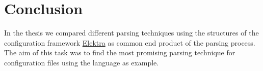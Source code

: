 \chapter{Conclusion}

%
%
%

In the thesis we compared different parsing techniques using the  structures of the configuration framework \href{https://www.libelektra.org}{Elektra} as common end product of the parsing process. The aim of this task was to find the most promising parsing technique for configuration files using the language  as example.
